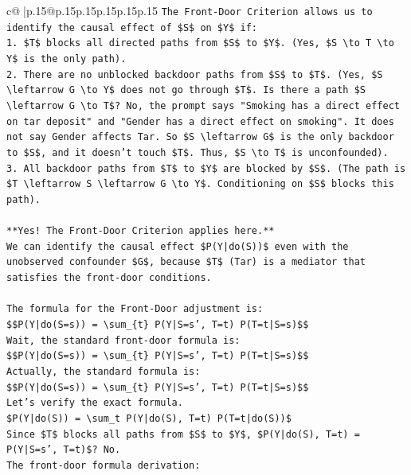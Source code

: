 \documentclass{article}
\begin{document}
{\begin{supertabular}{c@{$\;$}|p{.15\linewidth}@{}p{.15\linewidth}p{.15\linewidth}p{.15\linewidth}p{.15\linewidth}p{.15\linewidth}}
{{{\texttt{The Front{-}Door Criterion allows us to identify the causal effect of \$S\$ on \$Y\$ if:} \\
\texttt{1.  \$T\$ blocks all directed paths from \$S\$ to \$Y\$. (Yes, \$S \textbackslash{}to T \textbackslash{}to Y\$ is the only path).} \\
\texttt{2.  There are no unblocked backdoor paths from \$S\$ to \$T\$. (Yes, \$S \textbackslash{}leftarrow G \textbackslash{}to Y\$ does not go through \$T\$. Is there a path \$S \textbackslash{}leftarrow G \textbackslash{}to T\$? No, the prompt says "Smoking has a direct effect on tar deposit" and "Gender has a direct effect on smoking". It does not say Gender affects Tar. So \$S \textbackslash{}leftarrow G\$ is the only backdoor to \$S\$, and it doesn't touch \$T\$. Thus, \$S \textbackslash{}to T\$ is unconfounded).} \\
\texttt{3.  All backdoor paths from \$T\$ to \$Y\$ are blocked by \$S\$. (The path is \$T \textbackslash{}leftarrow S \textbackslash{}leftarrow G \textbackslash{}to Y\$. Conditioning on \$S\$ blocks this path).} \\
\\ 
\texttt{**Yes! The Front{-}Door Criterion applies here.**} \\
\texttt{We can identify the causal effect \$P(Y|do(S))\$ even with the unobserved confounder \$G\$, because \$T\$ (Tar) is a mediator that satisfies the front{-}door conditions.} \\
\\ 
\texttt{The formula for the Front{-}Door adjustment is:} \\
\texttt{\$\$P(Y|do(S=s)) = \textbackslash{}sum\_\{t\} P(Y|S=s', T=t) P(T=t|S=s)\$\$} \\
\texttt{Wait, the standard front{-}door formula is:} \\
\texttt{\$\$P(Y|do(S=s)) = \textbackslash{}sum\_\{t\} P(Y|S=s', T=t) P(T=t|S=s)\$\$} \\
\texttt{Actually, the standard formula is:} \\
\texttt{\$\$P(Y|do(S=s)) = \textbackslash{}sum\_\{t\} P(Y|S=s', T=t) P(T=t|S=s)\$\$} \\
\texttt{Let's verify the exact formula.} \\
\texttt{\$P(Y|do(S)) = \textbackslash{}sum\_t P(Y|do(S), T=t) P(T=t|do(S))\$} \\
\texttt{Since \$T\$ blocks all paths from \$S\$ to \$Y\$, \$P(Y|do(S), T=t) = P(Y|S=s', T=t)\$? No.} \\
\texttt{The front{-}door formula derivation:} \\
}}}
\end{supertabular}}
\end{document}

